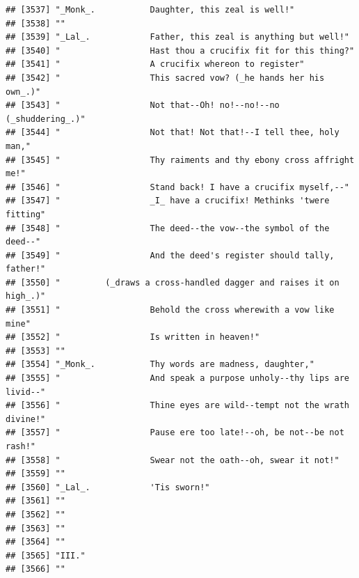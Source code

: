 \documentclass{article}\usepackage[]{graphicx}\usepackage[]{color}
\makeatletter
\newenvironment{kframe}{%
 \def\at@end@of@kframe{}%
 \ifinner\ifhmode%
  \def\at@end@of@kframe{\end{minipage}}%
  \begin{minipage}{\columnwidth}%
 \fi\fi%
 \def\FrameCommand##1{\hskip\@totalleftmargin \hskip-\fboxsep
 \colorbox{shadecolor}{##1}\hskip-\fboxsep
     \hskip-\linewidth \hskip-\@totalleftmargin \hskip\columnwidth}%
 \MakeFramed {\advance\hsize-\width
   \@totalleftmargin\z@ \linewidth\hsize
   \@setminipage}}%
 {\par\unskip\endMakeFramed%
 \at@end@of@kframe}
\newenvironment{knitrout}{}{} %
\makeatother
\begin{document}
\begin{knitrout}
\begin{kframe}
\begin{verbatim}
## [3537] "_Monk_.           Daughter, this zeal is well!"                              
## [3538] ""                                                                            
## [3539] "_Lal_.            Father, this zeal is anything but well!"                   
## [3540] "                  Hast thou a crucifix fit for this thing?"                  
## [3541] "                  A crucifix whereon to register"                            
## [3542] "                  This sacred vow? (_he hands her his own_.)"                
## [3543] "                  Not that--Oh! no!--no!--no (_shuddering_.)"                
## [3544] "                  Not that! Not that!--I tell thee, holy man,"               
## [3545] "                  Thy raiments and thy ebony cross affright me!"             
## [3546] "                  Stand back! I have a crucifix myself,--"                   
## [3547] "                  _I_ have a crucifix! Methinks 'twere fitting"              
## [3548] "                  The deed--the vow--the symbol of the deed--"               
## [3549] "                  And the deed's register should tally, father!"             
## [3550] "         (_draws a cross-handled dagger and raises it on high_.)"            
## [3551] "                  Behold the cross wherewith a vow like mine"                
## [3552] "                  Is written in heaven!"                                     
## [3553] ""                                                                            
## [3554] "_Monk_.           Thy words are madness, daughter,"                          
## [3555] "                  And speak a purpose unholy--thy lips are livid--"          
## [3556] "                  Thine eyes are wild--tempt not the wrath divine!"          
## [3557] "                  Pause ere too late!--oh, be not--be not rash!"             
## [3558] "                  Swear not the oath--oh, swear it not!"                     
## [3559] ""                                                                            
## [3560] "_Lal_.            'Tis sworn!"                                               
## [3561] ""                                                                            
## [3562] ""                                                                            
## [3563] ""                                                                            
## [3564] ""                                                                            
## [3565] "III."                                                                        
## [3566] ""                                                                            

\end{verbatim}
\end{kframe}
\end{knitrout}
\end{document}
